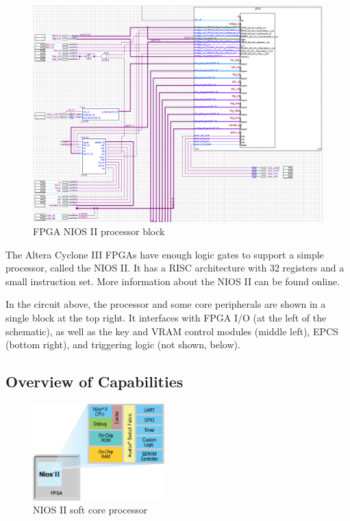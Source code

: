 \begin{figure}[ht!]
    \centering
    \includegraphics[width=6in]{fpga_logic/proc_overview.png}
		\caption{FPGA NIOS II processor block}
\end{figure}

The Altera Cyclone III FPGAs have enough logic gates to support a simple processor, called the NIOS II. It has a RISC architecture with 32 registers and a small instruction set. More information about the NIOS II can be found online.

In the circuit above, the processor and some core peripherals are shown in a single block at the top right. It interfaces with FPGA I/O (at the left of the schematic), as well as the key and VRAM control modules (middle left), EPCS (bottom right), and triggering logic (not shown, below).

\subsection{Overview of Capabilities}
\begin{figure}[ht!]
    \centering
    \includegraphics[width=2in]{images/nios_ii.png}
		\caption{NIOS II soft core processor}
\end{figure}

